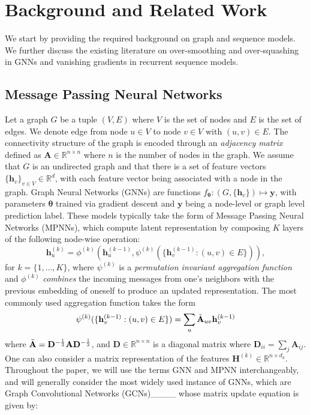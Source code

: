 \section{Background and Related Work}
\label{sec: Prelims}

We start by providing the required background on graph and sequence models. We further discuss the existing literature on over-smoothing and over-squashing in GNNs and vanishing gradients in recurrent sequence models. 
\vspace{-0.2cm}
\subsection{Message Passing Neural Networks}

Let a graph $G$ be a tuple $(V, E)$ where $V$ is the set of nodes and $ E$ is the set of edges. We denote edge from node $u\in V$ to node $v\in V$ with $(u,v)\in E$. The connectivity structure of the graph is encoded through an \textit{adjacency matrix} defined as $\mathbf{A} \in \mathbb{R}^{n\times n}$ where $n$ is the number of nodes in the graph. We assume that $G$ is an undirected graph and that there is a set of feature vectors $\{\mathbf{h}_{v}\}_{v\in V} \in \mathbb{R}^d$, with each feature vector being associated with a node in the graph. Graph Neural Networks (GNNs) are functions $f_{\boldsymbol{\theta}}: (G, \{\mathbf{h}_{v}\}) \mapsto \mathbf{y}$, with parameters $\boldsymbol{\theta}$ trained via gradient descent and $\mathbf{y}$ being a node-level or graph level prediction label. These models typically take the form of Message Passing Neural Networks (MPNNs), which compute latent representation by composing $K$ layers of the following node-wise operation:
\begin{equation}
    \mathbf{h}_{u}^{(k)} = \phi^{(k)} ( \mathbf{h}_{u}^{(k-1)}, \psi^{(k)} ( \{ \mathbf{h}_{v}^{(k-1)} : (u,v)\in E \} ) ),
\end{equation}
for $k=\{1,\hdots, K\}$, where $\psi^{(k)}$ is a \textit{permutation invariant aggregation function} and $\phi^{(k)}$ \textit{combines} the incoming messages from one's neighbors with the previous embedding of oneself to produce an updated representation. The most commonly used aggregation function takes the form 
\begin{equation}
    \psi^{(k)} ( \{ \mathbf{h}_{v}^{(k-1)} : (u,v)\in E \} )
    = \sum_{u}\Tilde{\mathbf{A}}_{uv}\mathbf{h}_{v}^{(k-1)}
\end{equation}
where $\Tilde{\mathbf{A}} = \mathbf{D}^{-\frac{1}{2}}\mathbf{A}\mathbf{D}^{-\frac{1}{2}}$, and $\mathbf{D}\in\mathbb{R}^{n\times n}$ is a diagonal matrix where $\mathbf{D}_{ii}=\sum_j\mathbf{A}_{ij}$. One can also consider a matrix representation of the features $\mathbf{H}^{(k)}\in\mathbb{R}^{n\times d_k}$. Throughout the paper, we will use the terms GNN and MPNN interchangeably, and will generally consider the most widely used instance of GNNs, which are Graph Convolutional Networks (GCNs)____ whose matrix update equation is given by:
